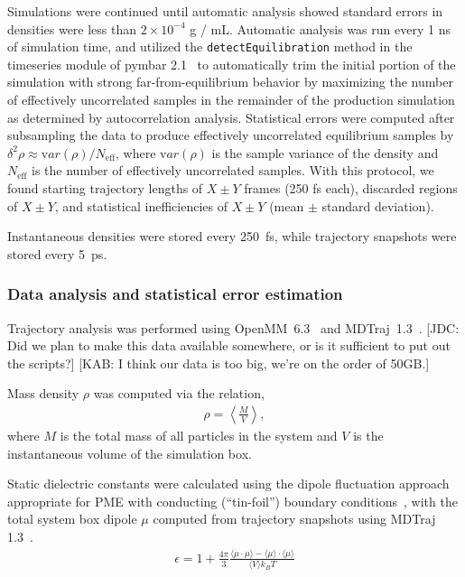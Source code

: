 \documentclass[aps,pre,twocolumn,nofootinbib,superscriptaddress,linenumbers]{revtex4-1}
\newcommand{\var}[1]{{\mathrm var}{(#1)}}
\begin{document}
Simulations were continued until automatic analysis showed standard errors in densities were less than $2 \times 10^{-4}$ g / mL.
Automatic analysis was run every 1 ns of simulation time, and utilized the {\tt detectEquilibration} method in the timeseries module of pymbar 2.1~\cite{shirts2008statistically} to automatically trim the initial portion of the simulation with strong far-from-equilibrium behavior by maximizing the number of effectively uncorrelated samples in the remainder of the production simulation as determined by autocorrelation analysis.
Statistical errors were computed after subsampling the data to produce effectively uncorrelated equilibrium samples by $\delta^2 \rho \approx \var{\rho} / N_\mathrm{eff}$, where $\var{\rho}$ is the sample variance of the density and $N_\mathrm{eff}$ is the number of effectively uncorrelated samples.  
With this protocol, we found starting trajectory lengths of $X \pm Y$ frames (250 fs each), discarded regions of $X \pm Y$, and statistical inefficiencies of $X \pm Y$ (mean $\pm$ standard deviation).  

Instantaneous densities were stored every 250~fs, while trajectory snapshots were stored every 5~ps.  

\subsubsection{Data analysis and statistical error estimation}

Trajectory analysis was performed using OpenMM~6.3~\cite{eastman2012openmm} and MDTraj~1.3~\cite{mcgibbon2014mdtraj}.  
{\color{red}[JDC: Did we plan to make this data available somewhere, or is it sufficient to put out the scripts?]}
{\color{red}[KAB: I think our data is too big, we're on the order of 50GB.]}


Mass density $\rho$ was computed via the relation,
\begin{eqnarray}
\rho = \left\langle \frac{M}{V} \right\rangle \label{equation:mass-density} ,
 \end{eqnarray}
where $M$ is the total mass of all particles in the system and $V$ is the instantaneous volume of the simulation box.

Static dielectric constants were calculated using the dipole fluctuation approach appropriate for PME with conducting (``tin-foil'') boundary conditions~\cite{horn2004, neumann1983dipole}, with the total system box dipole $\mu$ computed from trajectory snapshots using MDTraj 1.3~\cite{mcgibbon2014mdtraj}.
\begin{eqnarray}
\epsilon = 1 + \frac{4\pi}{3} \frac{\langle \mu \cdot \mu \rangle - \langle \mu \rangle \cdot \langle \mu \rangle}{\langle V \rangle k_B T} \label{equation:dielectric_calculation}
\end{eqnarray}
\end{document}
